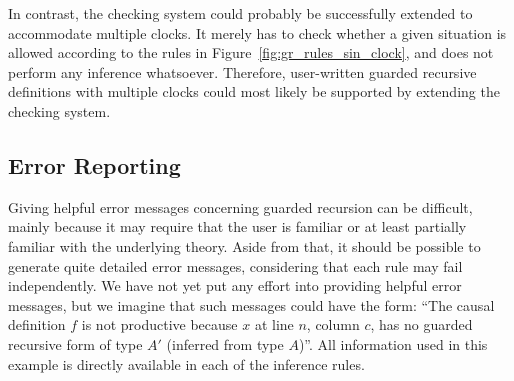 In contrast, the checking system could probably be successfully extended to
accommodate multiple clocks. It merely has to check whether a given situation is
allowed according to the rules in Figure~\ref{fig:gr_rules_sin_clock}, and does
not perform any inference whatsoever. Therefore, user-written guarded recursive
definitions with multiple clocks could most likely be supported by extending the
checking system.

\subsection{Error Reporting}
Giving helpful error messages concerning guarded recursion can be difficult,
mainly because it may require that the user is familiar or at least partially
familiar with the underlying theory. Aside from that, it should be possible to
generate quite detailed error messages, considering that each rule may fail
independently. We have not yet put any effort into providing helpful error
messages, but we imagine that such messages could have the form: ``The causal
definition $f$ is not productive because $x$ at line $n$, column $c$, has no
guarded recursive form of type $A'$ (inferred from type $A$)''. All information
used in this example is directly available in each of the inference rules.






